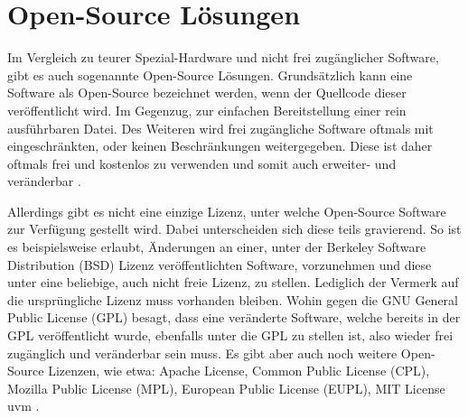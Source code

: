 
%
%
% 
% 
% 

\section{Open-Source Lösungen}
\label{sec:open_source}

Im Vergleich zu teurer Spezial-Hardware und nicht frei zugänglicher Software, gibt es auch sogenannte Open-Source Lösungen. Grundsätzlich kann eine Software als Open-Source bezeichnet werden, wenn der Quellcode dieser veröffentlicht wird. Im Gegenzug, zur einfachen Bereitstellung einer rein ausführbaren Datei.
Des Weiteren wird frei zugängliche Software oftmals mit eingeschränkten, oder keinen Beschränkungen weitergegeben. Diese ist daher oftmals frei und kostenlos zu verwenden und somit auch erweiter- und veränderbar \cite{gacek2004many}. 

Allerdings gibt es nicht eine einzige Lizenz, unter welche Open-Source Software zur Verfügung gestellt wird. Dabei unterscheiden sich diese teils gravierend. So ist es beispielsweise erlaubt, Änderungen an einer, unter der Berkeley Software Distribution (BSD) Lizenz veröffentlichten Software, vorzunehmen und diese unter eine beliebige, auch nicht freie Lizenz, zu stellen. Lediglich der Vermerk auf die ursprüngliche Lizenz muss vorhanden bleiben. Wohin gegen die GNU General Public License (GPL) besagt, dass eine veränderte Software, welche bereits in der GPL veröffentlicht wurde, ebenfalls unter die GPL zu stellen ist, also wieder frei zugänglich und veränderbar sein muss. Es gibt aber auch noch weitere Open-Source Lizenzen, wie etwa: Apache License, Common Public License (CPL), Mozilla Public License (MPL), European Public License (EUPL), MIT License uvm \cite{rosen2005open}.

